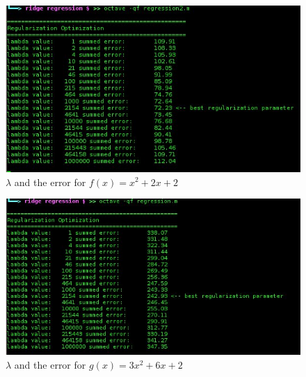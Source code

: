 \documentclass[12pt]{article}
\begin{document}
	\begin{figure}
		\centering
		\includegraphics[scale=0.7]{console_output_small_f}
		\caption{ $\lambda$ and the error for $f(x) = x^2 + 2x + 2$}
		\label{clog_2}
	\end{figure}

	\begin{figure}
		\centering
		\includegraphics[scale=0.7]{console_output_big_f}
		\caption{ $\lambda$ and the error for $g(x) = 3x^2 + 6x + 2$}
		\label{clog_1}
	\end{figure}
\end{document}
